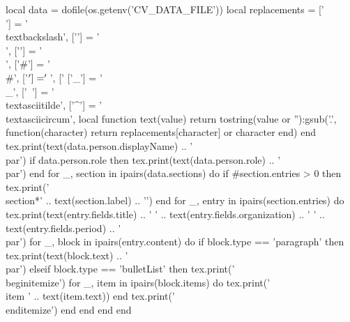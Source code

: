 \documentclass{article}
\begin{document}
\begin{luacode*}
local data = dofile(os.getenv('CV_DATA_FILE'))
local replacements = {
  ['\\'] = '\\textbackslash{}', ['{'] = '\\{', ['}'] = '\\}',
  ['#'] = '\\#', ['$'] = '\\$', ['%
  ['_'] = '\\_', ['~'] = '\\textasciitilde{}', ['^'] = '\\textasciicircum{}',
}
local function text(value)
  return tostring(value or ''):gsub('.', function(character)
    return replacements[character] or character
  end)
end
tex.print(text(data.person.displayName) .. '\\par')
if data.person.role then tex.print(text(data.person.role) .. '\\par') end
for _, section in ipairs(data.sections) do
  if #section.entries > 0 then tex.print('\\section*{' .. text(section.label) .. '}') end
  for _, entry in ipairs(section.entries) do
    tex.print(text(entry.fields.title) .. ' ' .. text(entry.fields.organization) .. ' ' .. text(entry.fields.period) .. '\\par')
    for _, block in ipairs(entry.content) do
      if block.type == 'paragraph' then
        tex.print(text(block.text) .. '\\par')
      elseif block.type == 'bulletList' then
        tex.print('\\begin{itemize}')
        for _, item in ipairs(block.items) do tex.print('\\item ' .. text(item.text)) end
        tex.print('\\end{itemize}')
      end
    end
  end
end
\end{luacode*}
\end{document}

